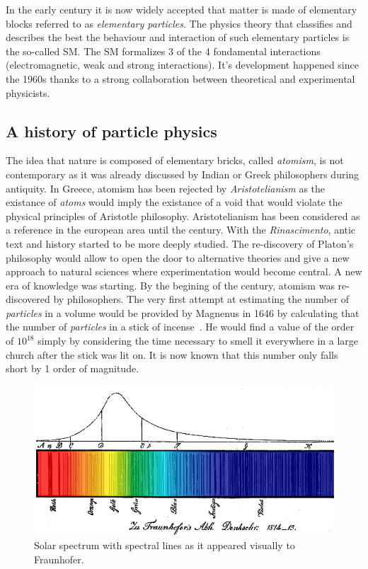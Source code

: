 	In the early  century it is now widely accepted that matter is made of elementary blocks referred to as \textit{elementary particles}. The physics theory that classifies and describes the best the behaviour and interaction of such elementary particles is the so-called \acl{SM}. The SM formalizes 3 of the 4 fondamental interactions (electromagnetic, weak and strong interactions). It's development happened since the 1960s thanks to a strong collaboration between theoretical and experimental physicists.

	\subsection{A history of particle physics}
	\label{chapt2:ssec:history}
	
	The idea that nature is composed of elementary bricks, called \textit{atomism}, is not contemporary as it was already discussed by Indian or Greek philosophers during antiquity. In Greece, atomism has been rejected by \textit{Aristotelianism} as the existance of \textit{atoms} would imply the existance of a void that would violate the physical principles of Aristotle philosophy. Aristotelianism has been considered as a reference in the european area until the  century. With the \textit{Rinascimento}, antic text and history started to be more deeply studied. The re-discovery of Platon's philosophy would allow to open the door to alternative theories and give a new approach to natural sciences where experimentation would become central. A new era of knowledge was starting. By the begining of the  century, atomism was re-discovered by philosophers. The very first attempt at estimating the number of \textit{particles} in a volume would be provided by Magnenus in 1646 by calculating that the number of \textit{particles} in a stick of incense~\cite{MAGNEGNUS1646}. He would find a value of the order of $10^{18}$ simply by considering the time necessary to smell it everywhere in a large church after the stick was lit on. It is now known that this number only falls short by 1 order of magnitude.

	\begin{figure}[H]
		\centering
		\includegraphics[width=0.7\linewidth]{fig/chapt2/Fraunhofer.jpg}
		\caption{\label{fig:spectral-lines} Solar spectrum with spectral lines as it appeared visually to Fraunhofer.}
	\end{figure}
	
